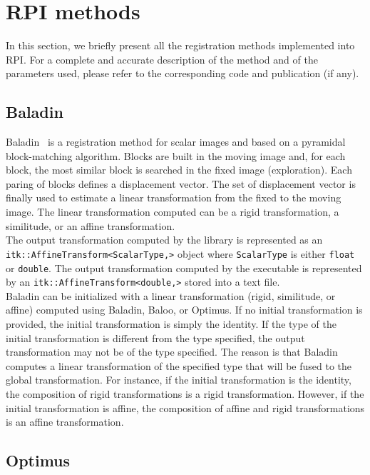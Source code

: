 \section{RPI methods}


In this section, we briefly present all the registration methods implemented into RPI. For a complete and accurate description of the method and of the parameters used, please refer to the corresponding code and publication (if any).



\subsection{Baladin}

Baladin~\cite{Ourselin_MICCAI_2000} is a registration method for scalar images and based on a pyramidal block-matching algorithm. Blocks are built in the moving image and, for each block, the most similar block is searched in the fixed image (exploration). Each paring of blocks defines a displacement vector. The set of displacement vector is finally used to estimate a linear transformation from the fixed to the moving image. The linear transformation computed can be a rigid transformation, a similitude, or an affine transformation.
\\
The output transformation computed by the library is represented as an \texttt{itk::\-Affine\-Transform\-<ScalarType,>} object where \texttt{ScalarType} is either \texttt{float} or \texttt{double}. The output transformation computed by the executable is represented by an \texttt{itk::\-Affine\-Transform\-<double,>} stored into a text file.
\\
Baladin can be initialized with a linear transformation (rigid, similitude, or affine) computed using Baladin, Baloo, or Optimus. If no initial transformation is provided, the initial transformation is simply the identity. If the type of the initial transformation is different from the type specified, the output transformation may not be of the type specified. The reason is that Baladin computes a linear transformation of the specified type that will be fused to the global transformation. For instance, if the initial transformation is the identity, the composition of rigid transformations is a rigid transformation. However, if the initial transformation is affine, the composition of affine and rigid transformations is an affine transformation.



\subsection{Optimus}

